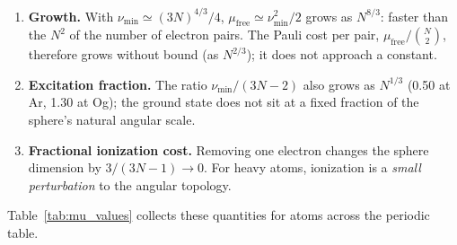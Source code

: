 \documentclass[aps,prl,twocolumn,superscriptaddress,longbibliography]{revtex4-2}
\newcommand{\mufree}{\mu_{\mathrm{free}}}
\begin{document}
\begin{enumerate}
  \item \textbf{Growth.}  With $\nu_{\min} \simeq (3N)^{4/3}/4$,
    $\mufree \simeq \nu_{\min}^2/2$ grows as $N^{8/3}$: faster than
    the $N^2$ of the number of electron pairs.  The Pauli cost per
    pair, $\mufree/\binom{N}{2}$, therefore grows without bound (as
    $N^{2/3}$); it does not approach a constant.

  \item \textbf{Excitation fraction.}  The ratio $\nu_{\min}/(3N-2)$
    also grows as $N^{1/3}$ (0.50 at Ar, 1.30 at Og); the ground
    state does not sit at a fixed fraction of the sphere's natural
    angular scale.

  \item \textbf{Fractional ionization cost.}  Removing one electron
    changes the sphere dimension by $3/(3N-1) \to 0$.  For heavy
    atoms, ionization is a \emph{small perturbation} to the angular
    topology.
\end{enumerate}

Table~\ref{tab:mu_values} collects these quantities for atoms across
the periodic table.
\end{document}
